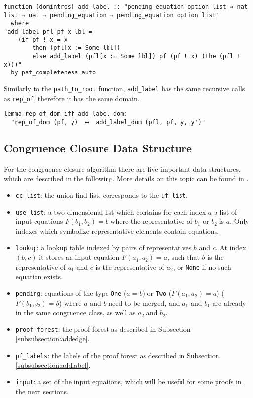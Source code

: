 \begin{lstlisting}
function (domintros) add_label :: "pending_equation option list ⇒ nat list ⇒ nat ⇒ pending_equation ⇒ pending_equation option list"
  where
"add_label pfl pf x lbl =
    (if pf ! x = x
        then (pfl[x := Some lbl])
        else add_label (pfl[x := Some lbl]) pf (pf ! x) (the (pfl ! x)))"
  by pat_completeness auto
\end{lstlisting}

Similarly to the \lstinline{path_to_root} function, \lstinline{add_label} has the same recursive calls as \lstinline{rep_of}, therefore it has the same domain.

\begin{lstlisting}
lemma rep_of_dom_iff_add_label_dom:
  "rep_of_dom (pf, y)  ⟷  add_label_dom (pfl, pf, y, y')"
\end{lstlisting}

\subsection{Congruence Closure Data Structure}
\label{subsection:datastructure}

For the congruence closure algorithm there are five important data structures, which are described in the following. More details on this topic can be found in \cite{Nieuwenhuis}.

\begin{itemize}
	\item \lstinline{cc_list}: the union-find list, corresponds to the \lstinline{uf_list}.

	\item \lstinline{use_list}: a two-dimensional list which contains for each index $a$ a list of input equations $F(b_1, b_2) = b$ where the representative of $b_1$ or $b_2$ is $a$.
    Only indexes which symbolize representative elements contain equations.

	\item \lstinline{lookup}: a lookup table indexed by pairs of representatives $b$ and $c$. At index $(b,c)$ it stores an input equation $F(a_1, a_2) = a$, such that $b$ is the representative of $a_1$ and $c$ is the representative of $a_2$, or \lstinline{None} if no such equation exists.

    \item \lstinline{pending}: equations of the type \lstinline{One} ($a = b$) or \lstinline{Two} ($F(a_1, a_2) = a$) ($F(b_1, b_2) = b$) where $a$ and $b$ need to be merged, and $a_1$ and $b_1$ are already in the same congruence class, as well as $a_2$ and $b_2$.

    \item \lstinline{proof_forest}: the proof forest as described in Subsection \ref{subsubsection:addedge}.

    \item \lstinline{pf_labels}: the labels of the proof forest as described in Subsection \ref{subsubsection:addlabel}.

    \item \lstinline{input}: a set of the input equations, which will be useful for some proofs in the next sections.
\end{itemize}

